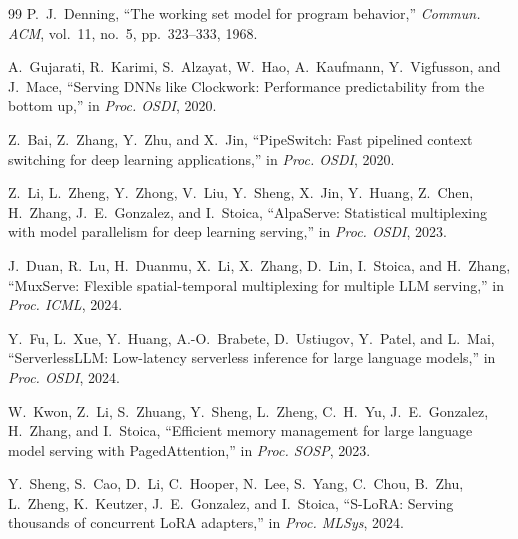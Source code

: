 \documentclass[10pt,conference,a4paper]{IEEEtran}
\begin{document}
\begin{thebibliography}{99}
 P.~J.~Denning, ``The working set model for program behavior,'' \emph{Commun. ACM}, vol.~11, no.~5, pp.~323--333, 1968.

 A.~Gujarati, R.~Karimi, S.~Alzayat, W.~Hao, A.~Kaufmann, Y.~Vigfusson, and J.~Mace, ``Serving DNNs like Clockwork: Performance predictability from the bottom up,'' in \emph{Proc. OSDI}, 2020.

 Z.~Bai, Z.~Zhang, Y.~Zhu, and X.~Jin, ``PipeSwitch: Fast pipelined context switching for deep learning applications,'' in \emph{Proc. OSDI}, 2020.

 Z.~Li, L.~Zheng, Y.~Zhong, V.~Liu, Y.~Sheng, X.~Jin, Y.~Huang, Z.~Chen, H.~Zhang, J.~E.~Gonzalez, and I.~Stoica, ``AlpaServe: Statistical multiplexing with model parallelism for deep learning serving,'' in \emph{Proc. OSDI}, 2023.

 J.~Duan, R.~Lu, H.~Duanmu, X.~Li, X.~Zhang, D.~Lin, I.~Stoica, and H.~Zhang, ``MuxServe: Flexible spatial-temporal multiplexing for multiple LLM serving,'' in \emph{Proc. ICML}, 2024.

 Y.~Fu, L.~Xue, Y.~Huang, A.-O.~Brabete, D.~Ustiugov, Y.~Patel, and L.~Mai, ``ServerlessLLM: Low-latency serverless inference for large language models,'' in \emph{Proc. OSDI}, 2024.

 W.~Kwon, Z.~Li, S.~Zhuang, Y.~Sheng, L.~Zheng, C.~H.~Yu, J.~E.~Gonzalez, H.~Zhang, and I.~Stoica, ``Efficient memory management for large language model serving with PagedAttention,'' in \emph{Proc. SOSP}, 2023.

 Y.~Sheng, S.~Cao, D.~Li, C.~Hooper, N.~Lee, S.~Yang, C.~Chou, B.~Zhu, L.~Zheng, K.~Keutzer, J.~E.~Gonzalez, and I.~Stoica, ``S-LoRA: Serving thousands of concurrent LoRA adapters,'' in \emph{Proc. MLSys}, 2024.

\end{thebibliography}
\end{document}
